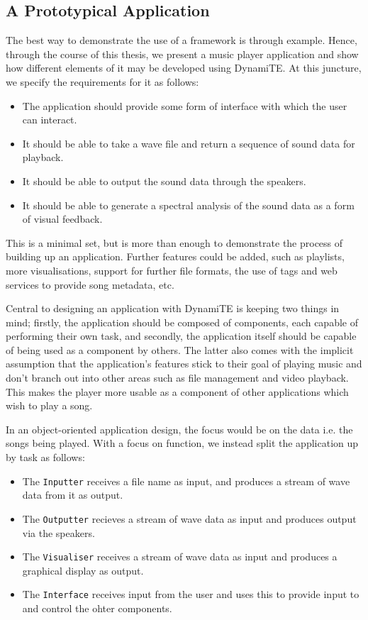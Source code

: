 \subsection{A Prototypical Application}
\label{protoapp}

The best way to demonstrate the use of a framework is through example.
Hence, through the course of this thesis, we present a music player
application and show how different elements of it may be developed
using DynamiTE.  At this juncture, we specify the requirements for it
as follows:

\begin{itemize}
\item The application should provide some form of interface with which
  the user can interact.
\item It should be able to take a wave file and return a sequence of
  sound data for playback.
\item It should be able to output the sound data through the speakers.
\item It should be able to generate a spectral analysis of the sound
  data as a form of visual feedback.
\end{itemize}

This is a minimal set, but is more than enough to demonstrate the
process of building up an application.  Further features could be
added, such as playlists, more visualisations, support for further
file formats, the use of tags and web services to provide song
metadata, etc.

Central to designing an application with DynamiTE is keeping two
things in mind; firstly, the application should be composed of
components, each capable of performing their own task, and secondly,
the application itself should be capable of being used as a component
by others.  The latter also comes with the implicit assumption that
the application's features stick to their goal of playing music and
don't branch out into other areas such as file management and video
playback.  This makes the player more usable as a component of other
applications which wish to play a song.

In an object-oriented application design, the focus would be on the
data i.e. the songs being played.  With a focus on function, we
instead split the application up by task as follows:

\begin{itemize}
\item The \texttt{Inputter} receives a file name as input, and
  produces a stream of wave data from it as output.
\item The \texttt{Outputter} recieves a stream of wave data as input
  and produces output via the speakers.
\item The \texttt{Visualiser} receives a stream of wave data as input
  and produces a graphical display as output.
\item The \texttt{Interface} receives input from the user and uses
  this to provide input to and control the ohter components.
\end{itemize}

